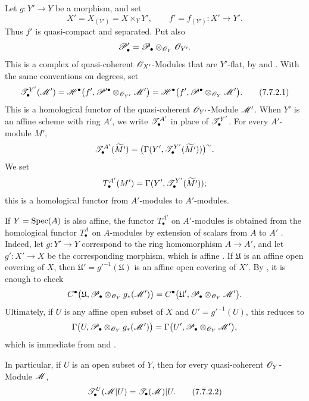 \begin{env}[7.7.2]
\label{III.7.7.2}
Let $g:Y'\to Y$ be a morphism, and set
\[
  X'=X_{(Y')}=X\times_Y Y',
  \qquad
  f'=f_{(Y')}:X'\longrightarrow Y'.
\]
Thus $f'$ is quasi-compact and separated.  Put also
\[
  \mathscr{P}'_\bullet
  =\mathscr{P}_\bullet\otimes_{\mathscr{O}_Y}\mathscr{O}_{Y'}.
\]
This is a complex of quasi-coherent $\mathscr{O}_{X'}$-Modules
that are $Y'$-flat, by  and
.  With the same conventions on degrees, set
\[
  \mathscr{T}^{Y'}_\bullet(\mathscr{M}')
  =
  \mathscr{H}^\bullet
    \bigl(f',
      \mathscr{P}'^\bullet\otimes_{\mathscr{O}_{Y'}}\mathscr{M}'\bigr)
  =
  \mathscr{H}^\bullet
    \bigl(f',
      \mathscr{P}^\bullet\otimes_{\mathscr{O}_Y}\mathscr{M}'\bigr).
  \tag{7.7.2.1}\label{III.7.7.2.1}
\]
This is a homological functor of the quasi-coherent
$\mathscr{O}_{Y'}$-Module $\mathscr{M}'$.  When $Y'$ is an affine
scheme with ring $A'$, we write $\mathscr{T}^{A'}_\bullet$ in
place of $\mathscr{T}^{Y'}_\bullet$.  For every $A'$-module $M'$,
\[
  \mathscr{T}^{A'}_\bullet(\widetilde{M'})
  =
  \bigl(
    \Gamma(Y',
      \mathscr{T}^{Y'}_\bullet(\widetilde{M'}))
  \bigr)^\sim.
\]
We set
\[
  T^{A'}_\bullet(M')
  =
  \Gamma(Y',
    \mathscr{T}^{Y'}_\bullet(\widetilde{M'}));
\]
this is a homological functor from $A'$-modules to
$A'$-modules.

If $Y=\operatorname{Spec}(A)$ is also affine, the functor
$T^{A'}_\bullet$ on $A'$-modules is obtained from the
homological functor $T^A_\bullet$ on $A$-modules by extension
of scalars from $A$ to $A'$ .  Indeed, let
$g:Y'\to Y$ correspond to the ring homomorphism $A\to A'$,
and let $g':X'\to X$ be the corresponding morphism, which is
affine .  If $\mathfrak U$ is an affine
open covering of $X$, then
$\mathfrak U'=g'^{-1}(\mathfrak U)$ is an affine open
covering of $X'$.  By , it is enough to check
\[
  C^\bullet
  \bigl(\mathfrak U,
    \mathscr{P}_\bullet\otimes_{\mathscr{O}_Y}g_*(\mathscr{M}')\bigr)
  =
  C^\bullet
  \bigl(\mathfrak U',
    \mathscr{P}_\bullet\otimes_{\mathscr{O}_Y}\mathscr{M}'\bigr).
\]
Ultimately, if $U$ is any affine open subset of $X$ and
$U'=g'^{-1}(U)$, this reduces to
\[
  \Gamma
  \bigl(U,
    \mathscr{P}_\bullet\otimes_{\mathscr{O}_Y}g_*(\mathscr{M}')\bigr)
  =
  \Gamma
  \bigl(U',
    \mathscr{P}_\bullet\otimes_{\mathscr{O}_Y}\mathscr{M}'\bigr),
\]
which is immediate from  and .

In particular, if $U$ is an open subset of $Y$, then for
every quasi-coherent $\mathscr{O}_Y$-Module $\mathscr{M}$,
\[
  \mathscr{T}^U_\bullet(\mathscr{M}|U)
  =
  \mathscr{T}_\bullet(\mathscr{M})|U.
  \tag{7.7.2.2}\label{III.7.7.2.2}
\]
\end{env}

